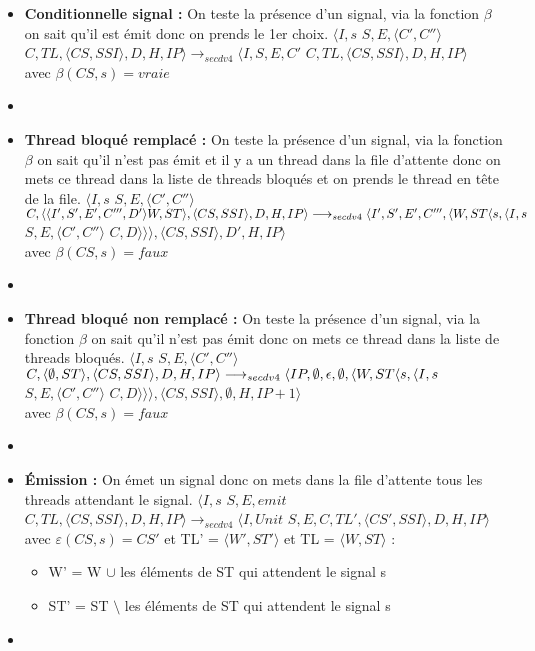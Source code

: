 \documentclass[10pt,a4paper]{article}
\begin{document}
\begin{enumerate}
\begin{itemize}
			    	\item[] \textbf{Conditionnelle signal :} On teste la présence d'un signal, via la fonction $\beta$ on sait qu'il est émit donc on prends le 1er choix.
			    	\smallbreak
			    	$\langle I,s$ $S,E,\langle C',C''\rangle$ $C,TL,\langle CS,SSI\rangle,D,H,IP\rangle 
			    	\longrightarrow_{secdv4} \langle I,S,E,C'$ $C,TL,\langle CS,SSI\rangle,D,H,IP\rangle$ \\
			    	avec $\beta(CS,s) = vraie$
			    	\item[]
			    	
			    	
			    	\item[] \textbf{ Thread bloqué remplacé :} On teste la présence d'un signal, via la fonction $\beta$ on sait qu'il n'est pas émit et il y a un thread dans la file d'attente
			    	donc on mets ce thread dans la liste de threads bloqués et on prends le thread en tête de la file.
			    	\smallbreak
			    	$\langle I,s$ $S,E,\langle C',C''\rangle$ $C,\langle\langle I',S',E',C''',D'\rangle W,ST\rangle,\langle CS,SSI\rangle,D,H,IP\rangle 
			    	\\\longrightarrow_{secdv4} \langle I',S',E',C''',\langle W,ST\langle s,\langle I,s$ $S,E,\langle C',C''\rangle$ $C,D\rangle\rangle\rangle,\langle CS,SSI\rangle,D',H,IP\rangle$ \\
			    	avec $\beta(CS,s) = faux$
			    	\item[]	
			    	
			    	\item[] \textbf{Thread bloqué non remplacé :} On teste la présence d'un signal, via la fonction $\beta$ on sait qu'il n'est pas émit donc on mets ce thread dans la liste de threads bloqués.
			    	\smallbreak 
			    	$\langle I,s$ $S,E,\langle C',C''\rangle$ $C,\langle \emptyset,ST\rangle,\langle CS,SSI\rangle,D,H,IP\rangle 
			    	\\\longrightarrow_{secdv4} \langle IP,\emptyset,\epsilon,\emptyset,\langle W,ST\langle s,\langle I,s$ $S,E,\langle C',C''\rangle$ $C,D\rangle\rangle\rangle,\langle CS,SSI\rangle,\emptyset,H,IP+1\rangle$ \\
			    	avec $\beta(CS,s) = faux$
			    	\item[]	
			    	\newpage
			    	\item[] \textbf{Émission :} On émet un signal donc on mets dans la file d'attente tous les threads attendant le signal.
			    	\smallbreak
			    	$\langle I,s$ $S,E,emit$ $C,TL,\langle CS,SSI\rangle,D,H,IP\rangle 
			    	\longrightarrow_{secdv4} \langle I,Unit$ $S,E,C,TL',\langle CS',SSI\rangle,D,H,IP\rangle$\\
			    	avec $\varepsilon(CS,s) = CS'$ et TL' = $\langle W',ST'\rangle$ et TL = $\langle W,ST\rangle$ :
			    	\begin{itemize}
			    		\item[] W' = W $\cup$ les éléments de ST qui attendent le signal s 
			    		\item[] ST' = ST $\setminus$ les éléments de ST qui attendent le signal s 
			    	\end{itemize}
			    	\item[]
			    	

\end{itemize}
\end{enumerate}
\end{document}
